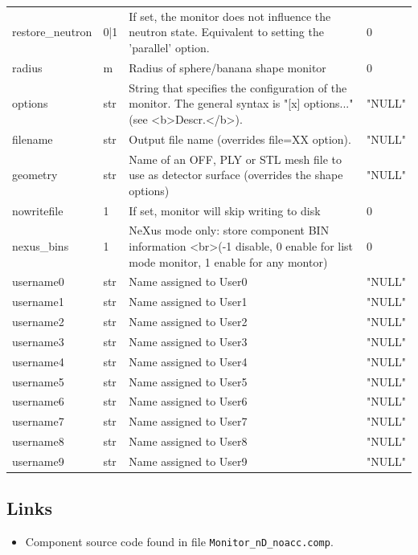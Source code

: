 \begin{longtable}{p{}p{}p{}p{}}
restore\_neutron & 0|1 & If set, the monitor does not influence the neutron state. Equivalent to setting the 'parallel' option. & 0 \\
radius & m & Radius of sphere/banana shape monitor & 0 \\
options & str & String that specifies the configuration of the monitor. The general syntax is "[x] options..." (see \textless{}b\textgreater{}Descr.\textless{}/b\textgreater{}). & "NULL" \\
filename & str & Output file name (overrides file=XX option). & "NULL" \\
geometry & str & Name of an OFF, PLY or STL mesh file to use as detector surface (overrides the shape options) & "NULL" \\
nowritefile & 1 & If set, monitor will skip writing to disk & 0 \\
nexus\_bins & 1 & NeXus mode only: store component BIN information \textless{}br\textgreater{}(-1 disable, 0 enable for list mode monitor, 1 enable for any montor) & 0 \\
username0 & str & Name assigned to User0 & "NULL" \\
username1 & str & Name assigned to User1 & "NULL" \\
username2 & str & Name assigned to User2 & "NULL" \\
username3 & str & Name assigned to User3 & "NULL" \\
username4 & str & Name assigned to User4 & "NULL" \\
username5 & str & Name assigned to User5 & "NULL" \\
username6 & str & Name assigned to User6 & "NULL" \\
username7 & str & Name assigned to User7 & "NULL" \\
username8 & str & Name assigned to User8 & "NULL" \\
username9 & str & Name assigned to User9 & "NULL" \\
\bottomrule
\end{longtable}

\subsection*{Links}
\begin{itemize}
  \item Component source code found in file \texttt{Monitor\_nD\_noacc.comp}.
\end{itemize}
